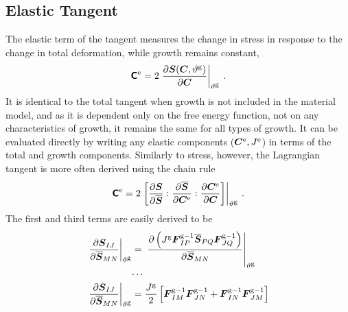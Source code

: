 \documentclass[10pt,letterpaper,oneside]{report}
\newcommand{\ten}[1]{\mbox{\boldmath $#1$}{}}
\newcommand{\tenf}[1]{\mbox{{\sffamily{\bfseries {#1}}}}}
\newcommand{\scas}[1]{\mbox{{\scriptsize{${\rm{#1}}$}}}{}}
\begin{document}
\subsection{Elastic Tangent} 
The elastic term of the tangent measures the change in stress in response to the change in total deformation, while growth remains constant, 
\begin{equation}
\tenf{C}^{\scas{e}} = 2 \left. \frac{ \partial \ten{S} ( \ten{C}, \vartheta^{\scas{g}}) }{ \partial \ten{C} } \right|_{\vartheta^{\scas{g}}} \, . 
\end{equation}
It is identical to the total tangent when growth is not included in the material model, and as it is dependent only on the free energy function, not on any characteristics of growth, it remains the same for all types of growth.  
It can be evaluated directly by writing any elastic components ($\ten{C}^{\scas{e}}, J^{\scas{e}}$) in terms of the total and growth components.  Similarly to stress, however, the Lagrangian tangent is more often derived using the chain rule
\begin{equation}
\tenf{C}^{\scas{e}} = 2 \left. \left[ \frac{ \partial \ten{S} }{ \partial \overline{\ten{S}} } : \frac{ \partial \overline{\ten{S}} }{ \partial \ten{C}^{\scas{e}} } : \frac{ \partial \ten{C}^{\scas{e} } }{ \partial \ten{C} } \right] \right|_{\vartheta^{\scas{g}}} \, .
\end{equation}
The first and third terms are easily derived to be
\begin{align}
\left. \frac{ \partial \ten{S}_{IJ} }{ \partial \overline{\ten{S}}_{MN} } \right|_{\vartheta^{\scas{g}}} 
={}& \left. \frac{ \partial \left( J^{\scas{g}} \ten{F}^{\scas{g}-1}_{IP} \overline{\ten{S}}_{PQ} \ten{F}^{\scas{g}-1}_{JQ} \right) }{ \partial \overline{\ten{S}}_{MN} } \right|_{\vartheta^{\scas{g}}}  
\\
\cdots{}& \notag \\
\left. \frac{ \partial \ten{S}_{IJ} }{ \partial \overline{\ten{S}}_{MN} } \right|_{\vartheta^{\scas{g}}} 
={}& \frac{J^{\scas{g}}}{2} \left[ \ten{F}^{\scas{g}-1}_{IM} \ten{F}^{\scas{g}-1}_{JN} + \ten{F}^{\scas{g}-1}_{IN} \ten{F}^{\scas{g}-1}_{JM} \right]  
\end{align}
\end{document}
